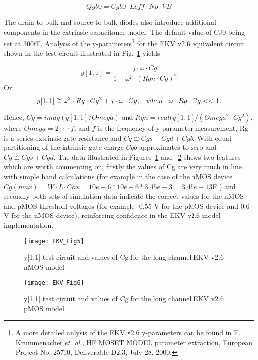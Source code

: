 \hspace{20mm}     \begin{equation} 
			Qgb0 = Cgb0 \cdot Leff \cdot Np \cdot VB
                  \end{equation}  

The drain to bulk and source to bulk diodes also introduce additional
components in the extrinsic capacitance model. The default value of
CJ0 being set at 300fF.  Analysis of the y-parameters\footnote{A more
detailed anlysis of the EKV v2.6 y-parameters can be found in
F. Krummenacher \textit{et. al.}, HF MOSET MODEL parameter extraction,
European Project No. 25710, Deliverable D2.3, July 28, 2000.} for the
EKV v2.6 equivalent circuit shown in the test circuit illustrated in
Fig.~\ref{fig:EKV5} yields

\hspace{20mm}     \begin{equation} 
			y[1,1] = \dfrac{j \cdot \omega \cdot Cg}{1+\omega^{2} \cdot (Rgn \cdot Cg)^{2}}
                  \end{equation}  
Or
\hspace{20mm}     \begin{equation} 
			y[1,1] \cong \omega^{2} \cdot Rg \cdot Cg^{2} + j \cdot \omega \cdot Cg, \hspace{3mm} when \hspace{3mm} \omega \cdot Rg \cdot Cg << 1.
                  \end{equation}  

Hence, $ Cg = imag( y[1,1]/ Omega)$ and $Rgn = real( y[1,1]/(
Omega^{2} \cdot Cg^{2})$, where $Omega = 2 \cdot \pi \cdot f$, and $f$
is the frequency of y-parameter measurement, Rg is a series extrinsic
gate resistance and $Cg \cong Cgs + Cgd + Cgb$.  With equal
partitioning of the intrinsic gate charge $Cgb$ approximates to zero
and $Cg \cong Cgs + Cgd$. The data illustrated in
Figures~\ref{fig:EKV5} and ~\ref{fig:EKV6} shows two features which
are worth commenting on; firstly the values of Cg are very much in
line with simple hand calculations (for example in the case of the
nMOS device $Cg(max) = W \cdot L \cdot Cox = 10e-6 * 10e-6* 3.45e-3 =
3.45e-13 $F ) and secondly both sets of simulation data indicate the
correct values for the nMOS and pMOS threshold voltages (for example
-0.55 V for the pMOS device and 0.6 V for the nMOS device),
reinforcing confidence in the EKV v2.6 model implementation.

\begin{figure} 
  \centering
  \texttt{[image: EKV\_Fig5]}
  \caption{y[1,1] test circuit and values of Cg for the long channel EKV v2.6 nMOS model}
  \label{fig:EKV5}
\end{figure} 
\begin{figure}
  \centering
  \texttt{[image: EKV\_Fig6]}
  \caption{y[1,1] test circuit and values of Cg for the long channel EKV v2.6 pMOS model}
  \label{fig:EKV6}
\end{figure}  



